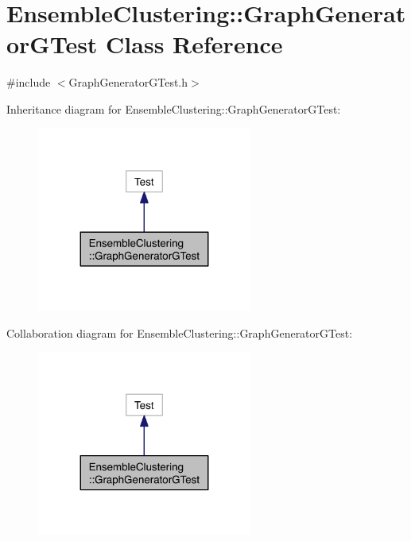 \hypertarget{class_ensemble_clustering_1_1_graph_generator_g_test}{\section{Ensemble\-Clustering\-:\-:Graph\-Generator\-G\-Test Class Reference}
\label{class_ensemble_clustering_1_1_graph_generator_g_test}
}


{\ttfamily \#include $<$Graph\-Generator\-G\-Test.\-h$>$}



Inheritance diagram for Ensemble\-Clustering\-:\-:Graph\-Generator\-G\-Test\-:
\nopagebreak
\begin{figure}[H]
\begin{center}
\leavevmode
\includegraphics[width=200pt]{class_ensemble_clustering_1_1_graph_generator_g_test__inherit__graph}
\end{center}
\end{figure}


Collaboration diagram for Ensemble\-Clustering\-:\-:Graph\-Generator\-G\-Test\-:
\nopagebreak
\begin{figure}[H]
\begin{center}
\leavevmode
\includegraphics[width=200pt]{class_ensemble_clustering_1_1_graph_generator_g_test__coll__graph}
\end{center}
\end{figure}
